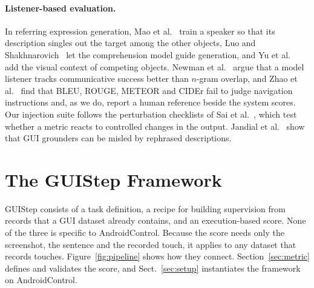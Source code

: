\documentclass[runningheads,a4paper]{llncs}
\begin{document}
\paragraph{Listener-based evaluation.}
In referring expression generation, Mao et al.~\cite{mao2016} train a speaker so that its description singles out the target among the other objects, Luo and Shakhnarovich~\cite{luo2017} let the comprehension model
guide generation, and Yu et al.~\cite{yu2016} add the visual context of competing objects. Newman et
al.~\cite{newman2020} argue that a model listener tracks communicative success better than $n$-gram
overlap, and Zhao et al.~\cite{zhao2021} find that BLEU, ROUGE, METEOR and CIDEr fail to judge
navigation instructions and, as we do, report a human reference beside the system scores. Our
injection suite follows the perturbation checklists of Sai et al.~\cite{sai2021}, which test whether
a metric reacts to controlled changes in the output. Jandial et al.~\cite{groundersunderstand} show that GUI grounders can be
misled by rephrased descriptions.

\section{The GUIStep Framework}
\label{sec:framework}

GUIStep consists of a task definition, a recipe for building supervision from records that a GUI dataset already contains, and an execution-based score. None of the three is specific to AndroidControl. Because the score needs only the screenshot, the sentence and the recorded touch, it applies to any dataset that records touches. Figure~\ref{fig:pipeline} shows how they connect. Section~\ref{sec:metric} defines and validates the score, and Sect.~\ref{sec:setup} instantiates the framework on AndroidControl.
\end{document}
